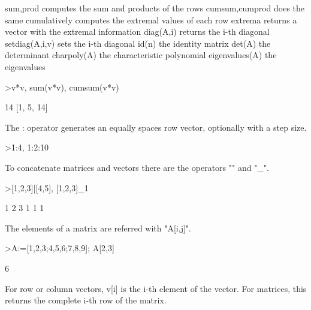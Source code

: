 \documentclass{article}
\begin{document}
\begin{eulernotebook}
\begin{eulercomment}
\begin{eulercomment}
\begin{eulercomment}
\begin{eulercomment}
\begin{eulercomment}
\begin{eulercomment}
\begin{eulercomment}
\end{eulercomment}
\begin{eulerttcomment}
  sum,prod computes the sum and products of the rows
  cumsum,cumprod does the same cumulatively
  computes the extremal values of each row
  extrema returns a vector with the extremal information
  diag(A,i) returns the i-th diagonal
  setdiag(A,i,v) sets the i-th diagonal
  id(n) the identity matrix
  det(A) the determinant
  charpoly(A) the characteristic polynomial
  eigenvalues(A) the eigenvalues
\end{eulerttcomment}
\begin{eulerprompt}
>v*v, sum(v*v), cumsum(v*v)
\end{eulerprompt}
\begin{euleroutput}
  [1,  4,  9]
  14
  [1,  5,  14]
\end{euleroutput}
\begin{eulercomment}
The : operator generates an equally spaces row vector, optionally with a step
size.
\end{eulercomment}
\begin{eulerprompt}
>1:4, 1:2:10
\end{eulerprompt}
\begin{euleroutput}
  [1,  2,  3,  4]
  [1,  3,  5,  7,  9]
\end{euleroutput}
\begin{eulercomment}
To concatenate matrices and vectors there are the operators "\textbar{}" and "\_".
\end{eulercomment}
\begin{eulerprompt}
>[1,2,3]|[4,5], [1,2,3]_1
\end{eulerprompt}
\begin{euleroutput}
  [1,  2,  3,  4,  5]
              1             2             3 
              1             1             1 
\end{euleroutput}
\begin{eulercomment}
The elements of a matrix are referred with "A[i,j]".
\end{eulercomment}
\begin{eulerprompt}
>A:=[1,2,3;4,5,6;7,8,9]; A[2,3]
\end{eulerprompt}
\begin{euleroutput}
  6
\end{euleroutput}
\begin{eulercomment}
For row or column vectors, v[i] is the i-th element of the vector. For
matrices, this returns the complete i-th row of the matrix.
\end{eulercomment}

\end{eulercomment}
\end{eulercomment}
\end{eulercomment}
\end{eulercomment}
\end{eulercomment}
\end{eulercomment}
\end{eulernotebook}
\end{document}
